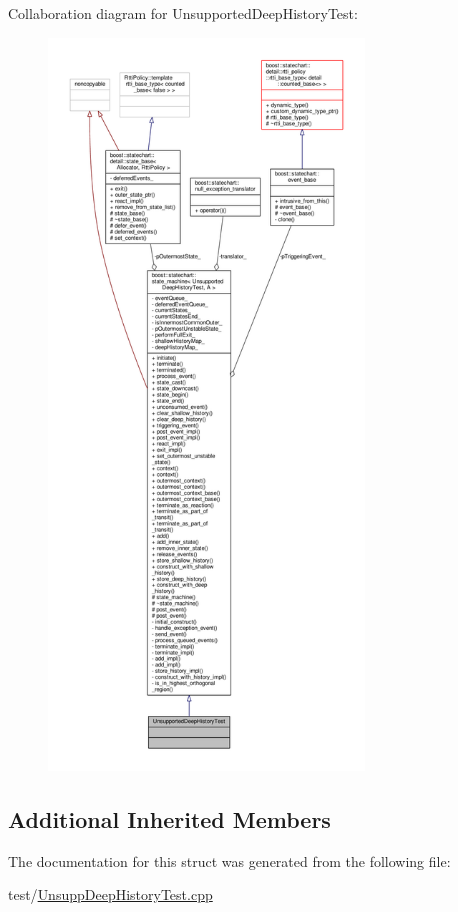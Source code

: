 Collaboration diagram for Unsupported\+Deep\+History\+Test\+:
\nopagebreak
\begin{figure}[H]
\begin{center}
\leavevmode
\includegraphics[height=550pt]{struct_unsupported_deep_history_test__coll__graph}
\end{center}
\end{figure}
\subsection*{Additional Inherited Members}


The documentation for this struct was generated from the following file\+:\begin{DoxyCompactItemize}
\item 
test/\mbox{\hyperlink{_unsupp_deep_history_test_8cpp}{Unsupp\+Deep\+History\+Test.\+cpp}}\end{DoxyCompactItemize}
